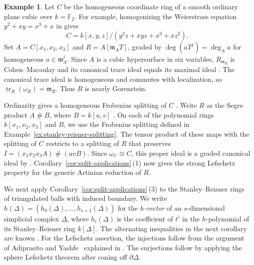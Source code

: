 \documentclass[a4paper,11pt]{amsart}
\DeclareMathOperator{\tr}{tr}
\newcommand{\kk}{k}
\newcommand{\m}{\mathfrak{m}}
\theoremstyle{definition}
\newtheorem{example}[theorem]{Example}
\begin{document}
\begin{example}\label{ex:rees-ordinary-cubic}
Let $C$ be the homogeneous coordinate ring of a smooth ordinary plane cubic over $\kk=\mathbb F_2$. For example, homogenizing the Weierstrass equation $y^2+xy=x^3+x$ in \cite[Section~2, (4)]{Sch22} gives
\[
 C=\kk[x,y,z]/(y^2z+xyz+x^3+xz^2).
\]
Set $A=C[x_1,x_2,x_3]$ and $R=A[\m_A T]$, graded by $\deg(aT^j)=\deg_A a$ for homogeneous $a\in\m_A^j$. Since $A$ is a cubic hypersurface in six variables, $R_{\m_R}$ is Cohen--Macaulay and its canonical trace ideal equals its maximal ideal \cite[Example~2.11]{EY26}. The canonical trace ideal is homogeneous and commutes with localization, so $\tr_R(\omega_R)=\m_R$. Thus $R$ is nearly Gorenstein.

Ordinarity gives a homogeneous Frobenius splitting of $C$ \cite[Example~2.3.1]{KKP21}. Write $R$ as the Segre product $A\mathbin{\#}B$, where $B=\kk[u,v]$ \cite[proof of Proposition~6.1]{Si00}. On each of the polynomial rings $\kk[x_1,x_2,x_3]$ and $B$, we use the Frobenius splitting defined in Example~\ref{ex:stanley-reisner-splitting}. The tensor product of these maps with the splitting of $C$ restricts to a splitting of $R$ that preserves $I=(x_1x_2x_3 A)\mathbin{\#}(uvB)$. Since $\omega_C\cong C$, this proper ideal is a graded canonical ideal by \cite[Theorem~4.3.1]{GW78}. Corollary~\ref{cor:split-applications}\,\textup{(1)} now gives the strong Lefschetz property for the generic Artinian reduction of $R$.
\end{example}

We next apply Corollary~\ref{cor:split-applications}\,\textup{(3)} to the Stanley--Reisner rings of triangulated balls with induced boundary.
We write $h(\Delta)=(h_0(\Delta),\ldots,h_{s+1}(\Delta))$ for the \emph{$h$-vector} of an $s$-dimensional simplicial complex $\Delta$, where $h_i(\Delta)$ is the coefficient of $t^i$ in the $h$-polynomial of its Stanley--Reisner ring $\kk[\Delta]$.
The alternating inequalities in the next corollary are known \cite[Section~5.1, (17) and Theorem~5.1]{Ath26}. For the Lefschetz assertion, the injections follow from the argument of Adiprasito and Yashfe~\cite{AY21} explained in \cite[Section~5.1]{Ath26}. The surjections follow by applying the sphere Lefschetz theorem \cite[Corollary~9.10]{PP20} after coning off $\partial\Delta$.
\end{document}
